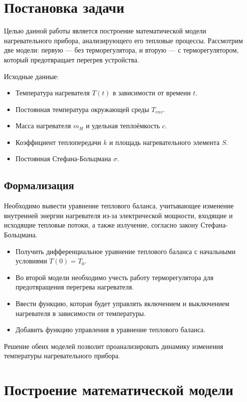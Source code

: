 \chapter{Постановка задачи}
Целью данной работы является построение математической модели нагревательного прибора, анализирующего его тепловые процессы. Рассмотрим две модели: первую — без терморегулятора, и вторую — с терморегулятором, который предотвращает перегрев устройства.

Исходные данные:
\begin{itemize}
	\item Температура нагревателя \( T(t) \) в зависимости от времени \( t \).
	\item Постоянная температура окружающей среды \( T_{env} \).
	\item Масса нагревателя \( m_H \) и удельная теплоёмкость \( c \).
	\item Коэффициент теплопередачи \( k \) и площадь нагревательного элемента \( S \).
	\item Постоянная Стефана-Больцмана \( \sigma \).
\end{itemize}
\section{Формализация}
Необходимо вывести уравнение теплового баланса, учитывающее изменение внутренней энергии нагревателя из-за электрической мощности, входящие и исходящие тепловые потоки, а также излучение, согласно закону Стефана-Больцмана\cite{masalov2016}.
\begin{itemize}
\item Получить дифференциальное уравнение теплового баланса с начальными условиями \( T(0) = T_0 \).

\item Во второй модели необходимо учесть работу терморегулятора для предотвращения перегрева нагревателя.

	\item 	Ввести функцию, которая будет управлять включением и выключением нагревателя в зависимости от температуры.
	
	\item Добавить функцию управления в уравнение теплового баланса.
\end{itemize}

Решение обеих моделей позволит проанализировать динамику изменения температуры нагревательного прибора.
\chapter{Построение математической модели}
